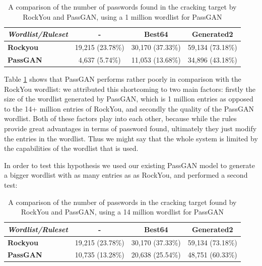 \begin{table}[H]
\begin{tabular}{|l|c|c|c|}
\hline
\textbf{\emph{Wordlist/Ruleset}} & \textbf{-} & \textbf{Best64} & \textbf{Generated2} \\ \hline
\textbf{Rockyou}          & 19,215 (23.78\%) & 30,170 (37.33\%) & 59,134 (73.18\%) \\ \hline
\textbf{PassGAN}          & 4,637 (5.74\%) & 11,053 (13.68\%) & 34,896 (43.18\%) \\ \hline
\end{tabular}
\caption{A comparison of the number of passwords found in the cracking target by RockYou and PassGAN,  using a 1 million wordlist for PassGAN}
\label{tab:test-set}
\wfill
\hfill
\end{table}

Table \ref{tab:test-set} shows that PassGAN performs rather poorly in comparison with the RockYou wordlist: we attributed this shortcoming to two main factors: firstly the size of the wordlist generated by PassGAN, which is 1 million entries as opposed to the 14+ million entries of RockYou, and secondly the quality of the PassGAN wordlist. Both of these factors play into each other, because while the rules provide great advantages in terms of password found, ultimately they just modify the entries in the wordlist. Thus we might say that the whole system is limited by the capabilities of the wordlist that is used.

In order to test this hypothesis we used our existing PassGAN model to generate a bigger wordlist with as many entries as as RockYou, and performed a second test:
\begin{table}[H]
\centering    
\begin{tabular}{|l|c|c|c|}
\hline
\textbf{\emph{Wordlist/Ruleset}} & \textbf{-} & \textbf{Best64} & \textbf{Generated2} \\ \hline
\textbf{Rockyou}          & 19,215 (23.78\%) & 30,170 (37.33\%) & 59,134 (73.18\%) \\ \hline
\textbf{PassGAN}          &  10,735 (13.28\%) & 20,638 (25.54\%) & 48,751 (60.33\%) \\ \hline
\end{tabular}
\caption{A comparison of the number of passwords in the cracking target found by RockYou and PassGAN, using a 14 million wordlist for PassGAN} 
\label{tab:passgan-big}
\end{table}

